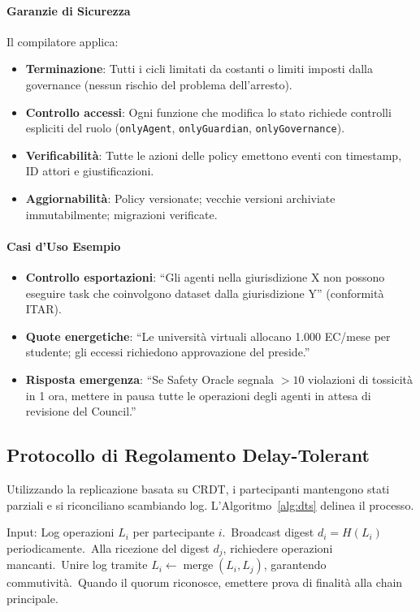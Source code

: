 \documentclass[11pt]{article}
\begin{document}
\paragraph{Garanzie di Sicurezza} Il compilatore applica:
\begin{itemize}[noitemsep]
  \item \textbf{Terminazione}: Tutti i cicli limitati da costanti o limiti imposti dalla governance (nessun rischio del problema dell'arresto).
  \item \textbf{Controllo accessi}: Ogni funzione che modifica lo stato richiede controlli espliciti del ruolo (\texttt{onlyAgent}, \texttt{onlyGuardian}, \texttt{onlyGovernance}).
  \item \textbf{Verificabilità}: Tutte le azioni delle policy emettono eventi con timestamp, ID attori e giustificazioni.
  \item \textbf{Aggiornabilità}: Policy versionate; vecchie versioni archiviate immutabilmente; migrazioni verificate.
\end{itemize}

\paragraph{Casi d'Uso Esempio}
\begin{itemize}[noitemsep]
  \item \textbf{Controllo esportazioni}: ``Gli agenti nella giurisdizione X non possono eseguire task che coinvolgono dataset dalla giurisdizione Y'' (conformità ITAR).
  \item \textbf{Quote energetiche}: ``Le università virtuali allocano 1.000 EC/mese per studente; gli eccessi richiedono approvazione del preside.''
  \item \textbf{Risposta emergenza}: ``Se Safety Oracle segnala $>10$ violazioni di tossicità in 1 ora, mettere in pausa tutte le operazioni degli agenti in attesa di revisione del Council.''
\end{itemize}

\subsection{Protocollo di Regolamento Delay-Tolerant}
Utilizzando la replicazione basata su CRDT, i partecipanti mantengono stati parziali e si riconciliano scambiando log. L'Algoritmo~\ref{alg:dts} delinea il processo.

\begin{algorithm}[H]
  \caption{Delay-Tolerant Settlement (DTS)}
  \label{alg:dts}
  \begin{algorithmic}[1]
    \STATE Input: Log operazioni $L_i$ per partecipante $i$.\
    \STATE Broadcast digest $d_i = H(L_i)$ periodicamente.\
    \STATE Alla ricezione del digest $d_j$, richiedere operazioni mancanti.\
    \STATE Unire log tramite $L_i \leftarrow \operatorname{merge}(L_i, L_j)$, garantendo commutività.\
    \STATE Quando il quorum riconosce, emettere prova di finalità alla chain principale.\
  \end{algorithmic}
\end{algorithm}
\end{document}
